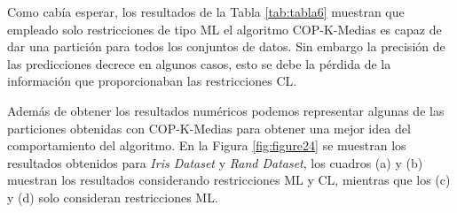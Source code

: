 Como cabía esperar, los resultados de la Tabla \ref{tab:tabla6} muestran que empleado solo restricciones de tipo \acs{ML} el algoritmo COP-K-Medias es capaz de dar una partición para todos los conjuntos de datos. Sin embargo la precisión de las predicciones decrece en algunos casos, esto se debe la pérdida de la información que proporcionaban las restricciones \acs{CL}. 

Además de obtener los resultados numéricos podemos representar algunas de las particiones obtenidas con COP-K-Medias para obtener una mejor idea del comportamiento del algoritmo. En la Figura \ref{fig:figure24} se muestran los resultados obtenidos para \textit{Iris Dataset} y \textit{Rand Dataset}, los cuadros (a) y (b) muestran los resultados considerando restricciones ML y CL, mientras que los (c) y (d) solo consideran restricciones ML.

